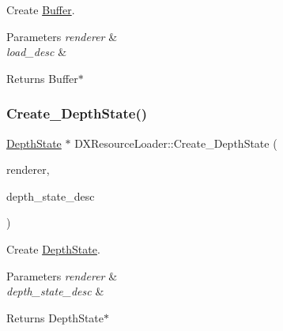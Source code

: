 Create \hyperlink{classBuffer}{Buffer}. 


\begin{DoxyParams}{Parameters}
{\em renderer} & \\
\hline
{\em load\+\_\+desc} & \\
\hline
\end{DoxyParams}
\begin{DoxyReturn}{Returns}
Buffer$\ast$ 
\end{DoxyReturn}
\mbox{\label{classDXResourceLoader_a470927b59b264d5ca7fc22b63d20801e}} 
\subsubsection{\texorpdfstring{Create\+\_\+\+Depth\+State()}{Create\_DepthState()}}
{\footnotesize\ttfamily \hyperlink{classDepthState}{Depth\+State} $\ast$ D\+X\+Resource\+Loader\+::\+Create\+\_\+\+Depth\+State (\begin{DoxyParamCaption}\item[{\hyperlink{classDXRenderer}{D\+X\+Renderer} $\ast$}]{renderer,  }\item[{const \hyperlink{structDepthStateDesc}{Depth\+State\+Desc} \&}]{depth\+\_\+state\+\_\+desc }\end{DoxyParamCaption})\hspace{0.3cm}{\ttfamily [static]}}



Create \hyperlink{classDepthState}{Depth\+State}. 


\begin{DoxyParams}{Parameters}
{\em renderer} & \\
\hline
{\em depth\+\_\+state\+\_\+desc} & \\
\hline
\end{DoxyParams}
\begin{DoxyReturn}{Returns}
Depth\+State$\ast$ 
\end{DoxyReturn}
\mbox{\label{classDXResourceLoader_a72a314827079951bfe5dd41fbab56229}} 
